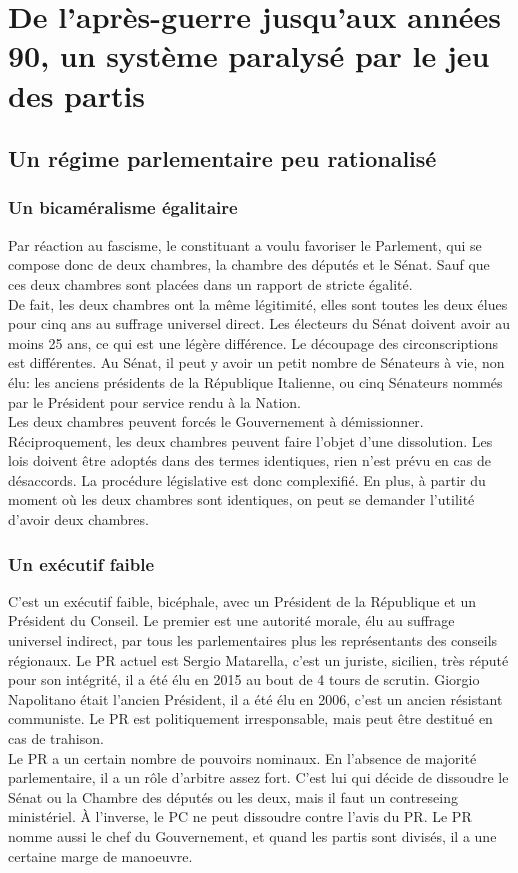 \documentclass[10pt, a4paper, openany]{book}
\begin{document}
\section{De l'après-guerre jusqu'aux années 90, un système paralysé par le jeu des partis}

\subsection{Un régime parlementaire peu rationalisé}

\subsubsection{Un bicaméralisme égalitaire}

Par réaction au fascisme, le constituant a voulu favoriser le Parlement, qui se compose donc de deux chambres, la chambre des députés et le Sénat. Sauf que ces deux chambres sont placées dans un rapport de stricte égalité. \\
De fait, les deux chambres ont la même légitimité, elles sont toutes les deux élues pour cinq ans au suffrage universel direct. Les électeurs du Sénat doivent avoir au moins 25 ans, ce qui est une légère différence. Le découpage des circonscriptions est différentes. Au Sénat, il peut y avoir un petit nombre de Sénateurs à vie, non élu: les anciens présidents de la République Italienne, ou cinq Sénateurs nommés par le Président pour service rendu à la Nation. \\
Les deux chambres peuvent forcés le Gouvernement à démissionner. Réciproquement, les deux chambres peuvent faire l'objet d'une dissolution. Les lois doivent être adoptés dans des termes identiques, rien n'est prévu en cas de désaccords. La procédure législative est donc complexifié. En plus, à partir du moment où les deux chambres sont identiques, on peut se demander l'utilité d'avoir deux chambres.

\subsubsection{Un exécutif faible}

C'est un exécutif faible, bicéphale, avec un Président de la République et un Président du Conseil. Le premier est une autorité morale, élu au suffrage universel indirect, par tous les parlementaires plus les représentants des conseils régionaux. Le PR actuel est Sergio Matarella, c'est un juriste, sicilien, très réputé pour son intégrité, il a été élu en 2015 au bout de 4 tours de scrutin. Giorgio Napolitano était l'ancien Président, il a été élu en 2006, c'est un ancien résistant communiste. Le PR est politiquement irresponsable, mais peut être destitué en cas de trahison. \\
Le PR a un certain nombre de pouvoirs nominaux. En l'absence de majorité parlementaire, il a un rôle d'arbitre assez fort. C'est lui qui décide de dissoudre le Sénat ou la Chambre des députés ou les deux, mais il faut un contreseing ministériel. À l'inverse, le PC ne peut dissoudre contre l'avis du PR. Le PR nomme aussi le chef du Gouvernement, et quand les partis sont divisés, il a une certaine marge de manoeuvre.
\end{document}
